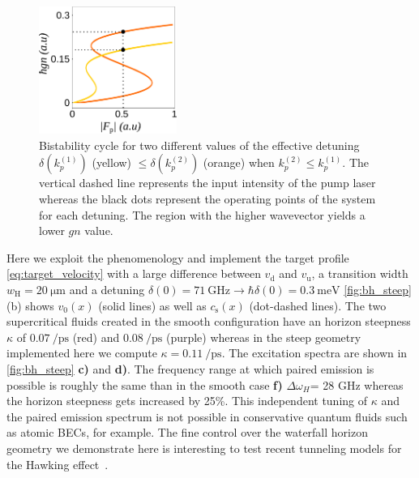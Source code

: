\begin{figure}
    \centering
    \includegraphics[width=0.4\textwidth]{chap_custom_st/fig/bistab_to_gn.pdf}
    \caption{Bistability cycle for two different values of the effective detuning $\delta(k^{(1)}_p)$ (yellow) $\leq \delta(k^{(2)}_p) $ (orange) when $k^{(2)}_p \leq k^{(1)}_p $. The vertical dashed line
    represents the input intensity of the pump laser whereas the black dots represent the operating points of the system for each detuning. The region with the higher wavevector
    yields a lower $gn$ value.}
    \label{fig:bistab_steep}
\end{figure}

Here we exploit the phenomenology and implement the target profile \autoref{eq:target_velocity} with a large difference between $v_\mathrm{d}$ and $v_\mathrm{u}$, a transition width $w_\mathrm{H}=\SI{20}{\micro\meter}$ and a detuning $\delta(0)=\SI{71}{\giga\hertz} \rightarrow\hbar\delta(0)=\SI{0.3}{\milli \electronvolt}$
\autoref{fig:bh_steep} (b) shows $v_0(x)$ (solid lines) as well as $c_\mathrm{s}(x)$ (dot-dashed lines). The two supercritical fluids created in the smooth configuration 
have an horizon steepness $\kappa$ of $\SI{0.07}{\per \pico \second}$ (red) and $\SI{0.08}{\per \pico \second}$ (purple) whereas in the steep geometry implemented here we compute $\kappa = \SI{0.11}{\per \pico \second}$. The excitation spectra are shown in \autoref{fig:bh_steep} \textbf{c)} and \textbf{d)}.
The frequency range at which paired emission is possible is roughly the same than in the smooth case \textbf{f)} $\Delta \omega_H$= 28 GHz whereas the horizon steepness 
gets increased by 25\%. This independent tuning of $\kappa$ and the paired emission spectrum is not possible in conservative quantum fluids such as atomic BECs, for example.
The fine control over the waterfall horizon geometry we demonstrate here is interesting to test recent tunneling models for the Hawking effect~\cite{delporro2024tunneling}.



